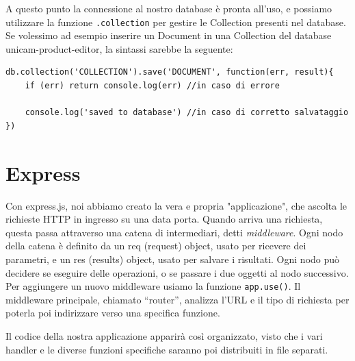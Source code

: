 A questo punto la connessione al nostro database è pronta all'uso, e possiamo utilizzare la funzione \texttt{.collection} per gestire le Collection presenti nel database.
Se volessimo ad esempio inserire un Document in una Collection del database unicam-product-editor, la sintassi sarebbe la seguente:
\begin{lstlisting}[caption={mongodb save}, style=javaScriptCode]
db.collection('COLLECTION').save('DOCUMENT', function(err, result){
	if (err) return console.log(err) //in caso di errore

	console.log('saved to database') //in caso di corretto salvataggio
})
\end{lstlisting}

\section{Express}
Con express.js, noi abbiamo creato la vera e propria "applicazione", che ascolta le richieste HTTP in ingresso su una data porta. Quando arriva una richiesta, questa passa attraverso una catena di intermediari, detti \emph{middleware}.
Ogni nodo della catena è definito da un req (request) object, usato per ricevere dei parametri, e un res (results) object, usato per salvare i risultati. 
Ogni nodo può decidere se eseguire delle operazioni, o se passare i due oggetti al nodo successivo. 
Per aggiungere un nuovo middleware usiamo la funzione \texttt{app.use()}. 
Il middleware principale, chiamato “router”, analizza l’URL e il tipo di richiesta per poterla poi indirizzare verso una specifica funzione.

Il codice della nostra applicazione apparirà così organizzato, visto che i vari handler e le diverse funzioni specifiche saranno poi distribuiti in file separati.

